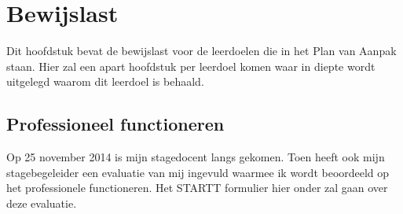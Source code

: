 \section{Bewijslast}
Dit hoofdstuk bevat de bewijslast voor de leerdoelen die in het Plan van Aanpak staan. Hier zal een apart hoofdstuk per leerdoel komen waar in diepte wordt uitgelegd waarom dit leerdoel is behaald.

\subsection{Professioneel functioneren}
Op 25 november 2014 is mijn stagedocent langs gekomen. Toen heeft ook mijn stagebegeleider een evaluatie van mij ingevuld waarmee ik wordt beoordeeld op het professionele functioneren. Het STARTT formulier hier onder zal gaan over deze evaluatie.
